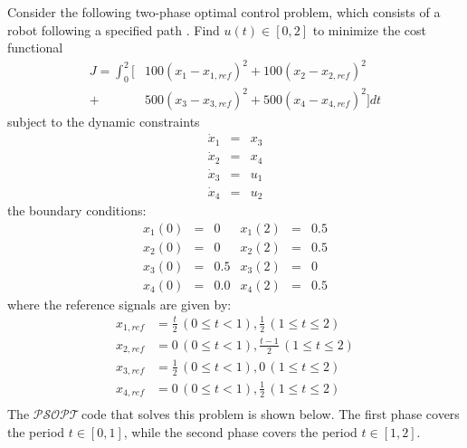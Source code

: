 \documentclass[a4paper,11pt]{report}    %
\newcommand{\psopt}{$\mathcal{PSOPT}$\,}  %
\newenvironment{shadedframe}{%
  \def\FrameCommand{\fcolorbox{black}{shadecolor}}%
  \MakeFramed {\FrameRestore}}
{\endMakeFramed}
\begin{document}
Consider the following two-phase optimal control problem, which consists of a robot following a specified path  \cite{VonStryk:99, Rutquist:09}.  Find $u(t) \in [0, 2]$ 
to minimize the cost functional
\begin{equation}
\begin{aligned}
  J = \int_{0}^{2} [ & 100( x_1 - x_{1,ref} )^2 +  100( x_2 - x_{2,ref} )^2\\
                   + &500( x_3 - x_{3,ref} )^2 +  500( x_4 - x_{4,ref} )^2 ] dt
\end{aligned}
\end{equation}
subject to the dynamic constraints
\begin{equation}
  \begin{array}{lcl}
   \dot x_1 &=& x_3 \\
   \dot x_2 &=& x_4 \\
   \dot x_3 &=& u_1 \\
   \dot x_4 &=& u_2
  \end{array}
\end{equation}
the boundary conditions:
 \begin{equation}
  \begin{array}{cccccc}
   x_1(0) &=& 0   & x_1(2) &=& 0.5 \\
   x_2(0) &=& 0   & x_2(2) &=& 0.5\\
   x_3(0) &=& 0.5 & x_3(2) &=& 0\\
   x_4(0) &=& 0.0 & x_4(2) &=& 0.5 
  \end{array}
\end{equation}
where the reference signals are given by:
\begin{equation}
\begin{aligned}
  x_{1,ref} &= \frac{t}{2} \, (0\le t<1), \frac{1}{2} \, ( 1 \le t \le 2 ) \\
  x_{2,ref} &= 0 \, (0\le t<1), \frac{t-1}{2} \, ( 1 \le t \le 2 ) \\
  x_{3,ref} &= \frac{1}{2} \, (0\le t<1), 0 \, ( 1 \le t \le 2 ) \\
  x_{4,ref} &= 0 \, (0\le t<1), \frac{1}{2} \, ( 1 \le t \le 2 ) \\
\end{aligned}
\end{equation}
The
\psopt code that solves this problem is shown below.  The first phase covers
the period $t \in [0,1]$, while the second phase covers the period $t \in [1,2]$.

\tiny
\begin{shadedframe}

\end{shadedframe}
\normalsize
\end{document}
